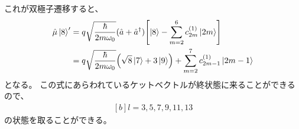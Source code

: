 \documentclass[../ap_2013.tex]{subfiles}
\begin{document}
これが双極子遷移すると、
\begin{equation}\begin{aligned}[b]
    \hat{\mu}\ket{8}'
    &=q\sqrt{\frac{\hbar}{2m\omega_0}}(\hat{a}+\hat{a}^\dagger)\qty[
        \ket{8}- \sum_{m=2}^{6}c_{2m}^{(1)}\ket{2m}]\\
    &= q\sqrt{\frac{\hbar}{2m\omega_0}}\qty(\sqrt{8}\ket{7}+3\ket{9})+\sum_{m=2}^{7}c_{2m-1}^{(1)}\ket{2m-1}
\end{aligned}\end{equation}
となる。
この式にあらわれているケットベクトルが終状態に来ることができるので、
\begin{equation}\begin{aligned}[b]
    l = 3,5,7,9,11,13
\end{aligned}\end{equation}
の状態を取ることができる。
\end{document}
